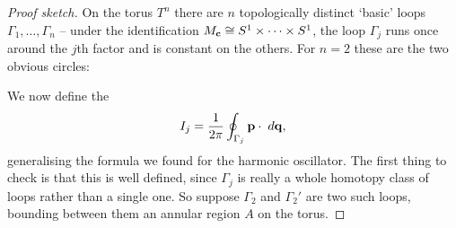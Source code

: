 \documentclass[a4paper]{scrartcl}
\begin{document}
\begin{proof}[Proof sketch]
	On the torus $T^n$ there are $n$ topologically distinct `basic' loops $\Gamma_1,\dots,\Gamma_n$ -- under the identification $M_{\mathbf{c}}\cong S^1\times\cdots\times S^1$, the loop $\Gamma_j$ runs once around the $j$th factor and is constant on the others. For $n=2$ these are the two obvious circles:
	\begin{center}
	\end{center}
	We now define the 
	$$
	I_j = \frac{1}{2\pi}\oint_{\Gamma_j}\mathbf{p}\cdot\; d\mathbf{q},
	$$
	generalising the formula we found for the harmonic oscillator. The first thing to check is that this is well defined, since $\Gamma_j$ is really a whole homotopy class of loops rather than a single one. So suppose $\Gamma_2$ and $\Gamma_2'$ are two such loops, bounding between them an annular region $A$ on the torus.


\end{proof}
\end{document}
